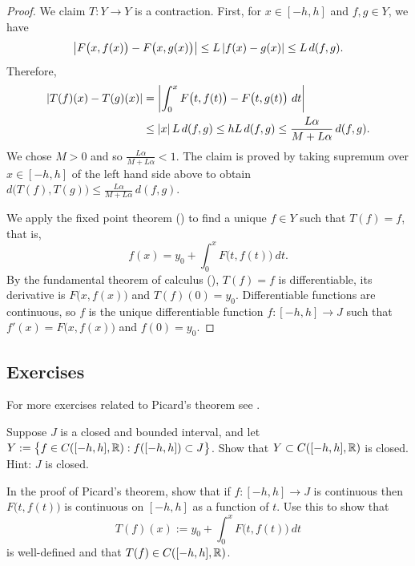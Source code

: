 \begin{proof}
We claim $T \colon Y \to Y$ is a contraction.  First, for $x \in [-h,h]$
and $f,g \in Y$, we have
\begin{equation*}
\left\lvert {F\bigl(x,f(x)\bigr) - F\bigl(x,g(x)\bigr)} \right\rvert \leq
L\left\lvert {f(x)- g(x)} \right\rvert \leq L \, d(f,g) .
\end{equation*}
Therefore,
\begin{equation*}
\begin{split}
\left\lvert {T(f)(x) - T(g)(x)} \right\rvert
&= \left\lvert {\int_0^x F\bigl(t,f(t)\bigr) - F\bigl(t,g(t)\bigr)~dt} \right\rvert \\
& \leq \left\lvert {x} \right\rvert L \, d(f,g)
 \leq h L\, d(f,g)
 \leq \frac{L\alpha}{M+L\alpha} \, d(f,g) .
\end{split}
\end{equation*}
We chose $M > 0$ and so
$\frac{L\alpha}{M+L\alpha} < 1$.  The claim is proved by
taking supremum over $x \in [-h,h]$ of the left hand side above to obtain
$d\bigl(T(f),T(g)\bigr) \leq \frac{L\alpha}{M+L\alpha} \, d(f,g)$.

We apply the fixed point theorem ()
to find a unique $f \in Y$ such that $T(f) = f$, that is,
\begin{equation*} %
f(x) = y_0 + \int_0^x F\bigl(t,f(t)\bigr)~dt .
\end{equation*}
By the fundamental theorem of calculus (),
$T(f) = f$ is differentiable, its derivative is
$F\bigl(x,f(x)\bigr)$ and $T(f)(0) = y_0$.
Differentiable functions are continuous, so
$f$ is the unique differentiable function $f \colon [-h,h] \to J$
such that
 $f'(x) = F\bigl(x,f(x)\bigr)$ and $f(0) = y_0$.
\end{proof}

\subsection{Exercises}

\begin{exnote}
For more exercises related to Picard's theorem see .
\end{exnote}

\begin{exercise}
Suppose $J$ is a closed and bounded interval, and let
$Y := \bigl\{ f \in C([-h,h],{\mathbb{R}}) : f([-h,h]) \subset J \bigr\}$.
Show that $Y \subset C([-h,h],{\mathbb{R}})$ is closed.  Hint: $J$ is closed.
\end{exercise}

\begin{exercise}
In the proof of Picard's theorem,
show that if $f \colon [-h,h] \to J$ is continuous then $F\bigl(t,f(t)\bigr)$
is continuous on $[-h,h]$ as a function of $t$.  Use this to show that
\begin{equation*}
T(f)(x)
:=
y_0 + \int_0^x F\bigl(t,f(t)\bigr)~dt
\end{equation*}
is well-defined and that $T(f) \in C([-h,h],{\mathbb{R}})$.
\end{exercise}


